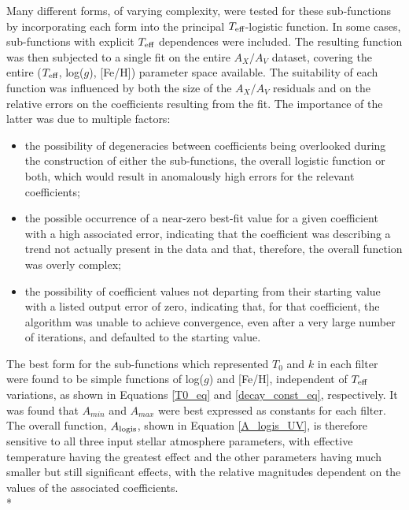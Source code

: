 \documentclass[12pt, a4paper]{report}
\begin{document}
Many different forms, of varying complexity, were tested for these sub-functions by incorporating each form into the principal $T_{\textnormal{eff}}$-logistic function. In some cases, sub-functions with explicit $T_{\textnormal{eff}}$ dependences were included. The resulting function was then subjected to a single fit on the entire $A_{X}/A_{V}$ dataset, covering the entire ($T_{\textnormal{eff}}$,  log($g$), [Fe/H]) parameter space available. The suitability of each function was influenced by both the size of the $A_{X}/A_{V}$ residuals and on the relative errors on the coefficients resulting from the fit. The importance of the latter was due to multiple factors:

\begin{itemize}
\item the possibility of degeneracies between coefficients being overlooked during the construction of either the sub-functions, the overall logistic function or both, which would result in anomalously high errors for the relevant coefficients;
\item the possible occurrence of a near-zero best-fit value for a given coefficient with a high associated error, indicating that the coefficient was describing a trend not actually present in the data and that, therefore, the overall function was overly complex;
\item the possibility of coefficient values not departing from their starting value with a listed output error of zero, indicating that, for that coefficient, the algorithm was unable to achieve convergence, even after a very large number of iterations, and defaulted to the starting value.
\end{itemize}

The best form for the sub-functions which represented $T_{0}$ and $k$ in each filter were found to be simple functions of log($g$) and [Fe/H], independent of $T_{\textnormal{eff}}$ variations, as shown in Equations \ref{T0_eq} and \ref{decay_const_eq}, respectively. It was found that $A_{min}$ and $A_{max}$ were best expressed as constants for each filter. The overall function, $A_{\textnormal{logis}}$, shown in Equation \ref{A_logis_UV}, is therefore sensitive to all three input stellar atmosphere parameters, with effective temperature having the greatest effect and the other parameters having much smaller but still significant effects, with the relative magnitudes dependent on the values of the associated coefficients.\\*
\end{document}
